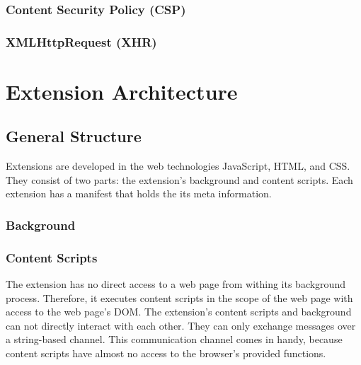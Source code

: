 \subsubsection{Content Security Policy (CSP)}

\subsubsection{XMLHttpRequest (XHR)}


\section{Extension Architecture}
	
\subsection{General Structure}

	Extensions are developed in the web technologies JavaScript, HTML, and CSS. They consist of two parts: the extension's background and content scripts. Each extension has a manifest that holds the its meta information.
	
\subsubsection{Background} 

\subsubsection{Content Scripts}

	The extension has no direct access to a web page from withing its background process. Therefore, it executes content scripts in the scope of the web page with access to the web page's DOM. The extension's content scripts and background can not directly interact with each other. They can only exchange messages over a string-based channel. This communication channel comes in handy, because content scripts have almost no access to the browser's provided functions.  
	
